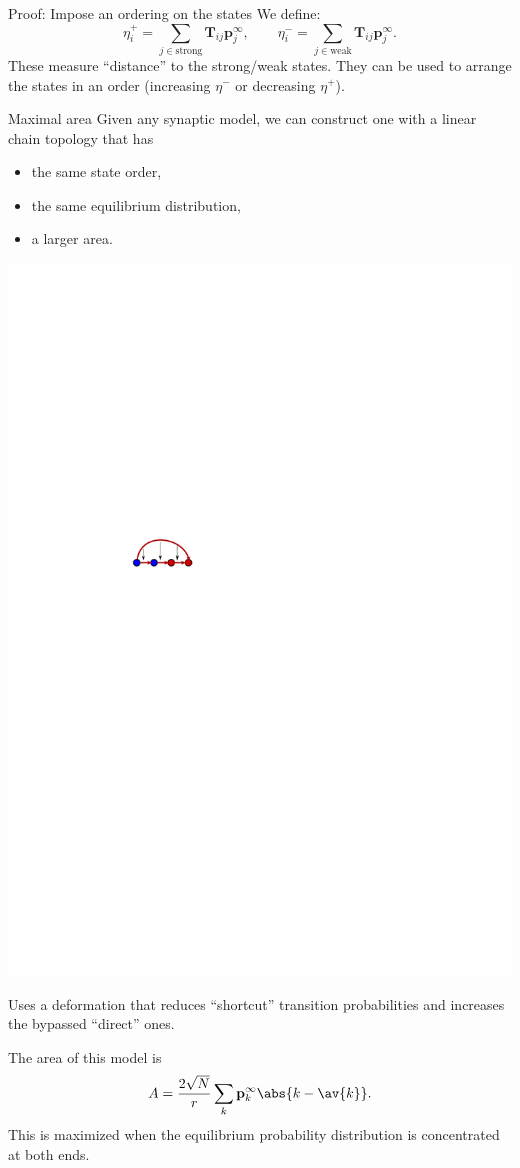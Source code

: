 \documentclass[final,hyperref={pdfpagelabels=false,bookmarks=false}]{beamer}
\newcommand{\eq}{\mathbf{p}^\infty}
\newcommand{\fpt}{\mathbf{T}}
\begin{document}
\begin{frame}{}
\begin{columns}[t]
\begin{column}{0.415\linewidth}
\begin{block}{Proof: Impose an ordering on the states}
 \vp We define:
 \begin{equation*}
   \eta^+_i = \sum_{j\in\text{strong}} \fpt_{ij} \eq_j,
   \qquad
   \eta^-_i = \sum_{j\in\text{weak}} \fpt_{ij} \eq_j.
 \end{equation*}
 These measure ``distance'' to the strong/weak states.
 They can be used to arrange the states in an order (increasing $\eta^-$ or decreasing $\eta^+$).
%
\end{block}


\begin{block}{Maximal area}
%
 Given any synaptic model, we can construct one with a linear chain topology that has
 \parbox[c]{0.34\linewidth}{
  \begin{itemize}
    \item the same state order,
    \item the same equilibrium distribution,
    \item a larger area.
  \end{itemize}
 }
 \parbox[c]{0.34\linewidth}{
  \begin{center}
    \includegraphics[width=0.4\linewidth]{shortcut.svg}
  \end{center}
 }

 Uses a deformation that reduces ``shortcut'' transition probabilities and increases the bypassed ``direct'' ones.

 \vp The area of this model is
 \begin{equation*}
   A = \frac{2\sqrt{N}}{r}\sum_k \eq_k \abs{k-\av{k}}.
 \end{equation*}
 This is maximized when the equilibrium probability distribution is concentrated at both ends.
%
\end{block}






\end{column}
\end{columns}
\end{frame}
\end{document}
